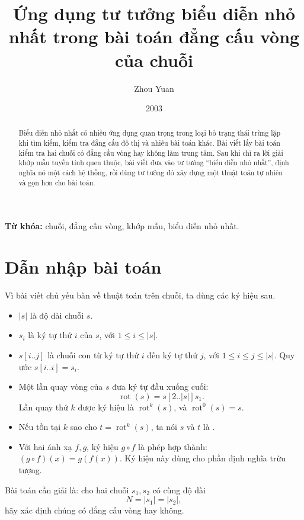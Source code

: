 \documentclass[11pt]{article}
\title{Ứng dụng tư tưởng biểu diễn nhỏ nhất trong bài toán đẳng cấu vòng của chuỗi}
\author{Zhou Yuan}
\date{2003}
\begin{document}
\maketitle


\begin{abstract}
Biểu diễn nhỏ nhất có nhiều ứng dụng quan trọng trong loại bỏ trạng thái trùng
lặp khi tìm kiếm, kiểm tra đẳng cấu đồ thị và nhiều bài toán khác. Bài viết
lấy bài toán kiểm tra hai chuỗi có đẳng cấu vòng hay không làm trung tâm. Sau
khi chỉ ra lời giải khớp mẫu tuyến tính quen thuộc, bài viết đưa vào tư tưởng
``biểu diễn nhỏ nhất'', định nghĩa nó một cách hệ thống, rồi dùng tư tưởng đó
xây dựng một thuật toán tự nhiên và gọn hơn cho bài toán.
\end{abstract}

\noindent\textbf{Từ khóa:} chuỗi, đẳng cấu vòng, khớp mẫu, biểu diễn nhỏ
nhất.

\section{Dẫn nhập bài toán}

Vì bài viết chủ yếu bàn về thuật toán trên chuỗi, ta dùng các ký hiệu sau.

\begin{itemize}
  \item \(|s|\) là độ dài chuỗi \(s\).
  \item \(s_i\) là ký tự thứ \(i\) của \(s\), với \(1\le i\le |s|\).
  \item \(s[i..j]\) là chuỗi con từ ký tự thứ \(i\) đến ký tự thứ \(j\),
  với \(1\le i\le j\le |s|\). Quy ước \(s[i..i]=s_i\).
  \item Một lần quay vòng của \(s\) đưa ký tự đầu xuống cuối:
  \[
    \operatorname{rot}(s)=s[2..|s|]s_1.
  \]
  Lần quay thứ \(k\) được ký hiệu là \(\operatorname{rot}^k(s)\), và
  \(\operatorname{rot}^0(s)=s\).
  \item Nếu tồn tại \(k\) sao cho \(t=\operatorname{rot}^k(s)\), ta nói
  \(s\) và \(t\) là .
  \item Với hai ánh xạ \(f,g\), ký hiệu \(g\circ f\) là phép hợp thành:
  \((g\circ f)(x)=g(f(x))\). Ký hiệu này dùng cho phần định nghĩa trừu tượng.
\end{itemize}

Bài toán cần giải là: cho hai chuỗi \(s_1,s_2\) có cùng độ dài
\[
  N=|s_1|=|s_2|,
\]
hãy xác định chúng có đẳng cấu vòng hay không.
\end{document}
